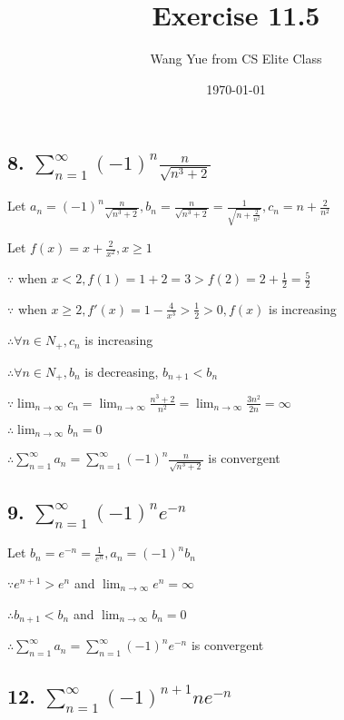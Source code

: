 \documentclass{article}
\begin{document}
    \title{Exercise 11.5}
    \author{Wang Yue from CS Elite Class}
    \date{\today}

    \maketitle

    \subsection*{8. $\sum_{n=1}^\infty (-1)^n \frac{n}{\sqrt{n^3+2}}$}
 
    Let $a_n = (-1)^n \frac{n}{\sqrt{n^3 + 2}}, b_n = \frac{n}{\sqrt{n^3 + 2}} = \frac{1}{\sqrt{n + \frac{2}{n^2}}}, c_n = n + \frac{2}{n^2}$

    Let $f(x) = x + \frac{2}{x^2}, x \geq 1$

    $\because$ when $x < 2, f(1) = 1 + 2 = 3 > f(2) = 2 + \frac 1 2 = \frac 5 2$

    $\because$ when $x \geq 2, f'(x) = 1 - \frac{4}{x^3} > \frac{1}{2} > 0, f(x)$ is increasing

    $\therefore \forall n \in N_+, c_n$ is increasing

    $\therefore \forall n \in N_+, b_n$ is decreasing, $b_{n+1} < b_n$

    $\because \lim_{n\to\infty} c_n = \lim_{n\to\infty}\frac{n^3+2}{n^2} = \lim_{n\to\infty}\frac{3n^2}{2n} = \infty$

    $\therefore \lim_{n\to\infty} b_n = 0$

    $\therefore \sum_{n=1}^\infty a_n = \sum_{n=1}^\infty (-1)^n \frac{n}{\sqrt{n^3 + 2}}$ is convergent

    \subsection*{9. $\sum_{n=1}^\infty (-1)^n e^{-n}$}

    Let $b_n = e^{-n} = \frac{1}{e^n}, a_n = (-1)^nb_n$

    $\because e^{n+1} > e^{n}$ and $\lim_{n\to\infty}e^n = \infty$

    $\therefore b_{n+1} < b_n$ and $\lim_{n\to\infty} b_n = 0$

    $\therefore \sum_{n=1}^\infty a_n = \sum_{n=1}^\infty (-1)^n e^{-n}$ is convergent

    \subsection*{12. $\sum_{n=1}^\infty (-1)^{n+1} ne^{-n}$}
    
\end{document}
